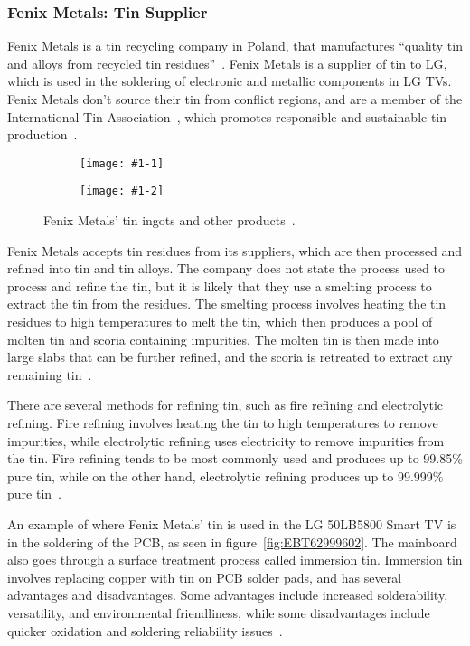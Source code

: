 \documentclass[12pt, letterpaper]{article}
\newcommand{\imgs}[2]{
  \begin{figure}[H]
    \medskip
    \begin{subfigure}{.5\textwidth}
      \centering
      \texttt{[image: \#1-1]}
    \end{subfigure}%
    \begin{subfigure}{.5\textwidth}
      \centering
      \texttt{[image: \#1-2]}
    \end{subfigure}
    \caption{#2}
    \medskip\label{fig:#1}
  \end{figure}
}
\begin{document}
\subsubsection{Fenix Metals: Tin Supplier}

Fenix Metals is a tin recycling company in Poland, that manufactures
``quality tin and alloys from recycled tin
residues''~\autocite{fenix-metals-no-dateB}. Fenix Metals is a
supplier of tin to LG, which is used in the soldering of electronic
and metallic components in LG TVs. Fenix Metals don't source their
tin from conflict regions, and are a member of the International Tin
Association~\autocite{international-tin-association-2022}, which
promotes responsible and sustainable tin
production~\autocite{international-tin-association-2024}.

\imgs{fenix-metals}{Fenix Metals' tin ingots and other
products~\autocite{fenix-metals-no-dateC}.}

Fenix Metals accepts tin residues from its suppliers, which are then
processed and refined into tin and tin alloys. The company does not
state the process used to process and refine the tin, but it is likely that they
use a smelting process to extract the tin from the residues. The
smelting process involves heating the tin residues to high temperatures
to melt the tin, which then produces a pool of molten tin and scoria
containing impurities. The molten tin is then made into large slabs that can be
further refined, and the scoria is retreated to extract any remaining
tin~\autocite{barry-1999}.

There are several methods for refining tin, such as fire refining and
electrolytic refining. Fire refining involves heating the tin to high
temperatures to remove impurities, while electrolytic refining uses
electricity to remove impurities from the tin. Fire refining tends to be
most commonly used and produces up to 99.85\% pure tin, while
on the other hand, electrolytic refining produces up to 99.999\% pure
tin~\autocite{barry-1999}.

An example of where Fenix Metals' tin is used in the LG 50LB5800 Smart
TV is in the soldering of the PCB, as seen in
figure~\ref{fig:EBT62999602}. The mainboard also goes through a
surface treatment process called immersion tin. Immersion tin involves
replacing copper with tin on
PCB solder pads, and has several advantages and disadvantages. Some
advantages include increased solderability, versatility, and
environmental friendliness, while some disadvantages include quicker
oxidation and soldering reliability issues~\autocite{jenell-2023}.
\end{document}
